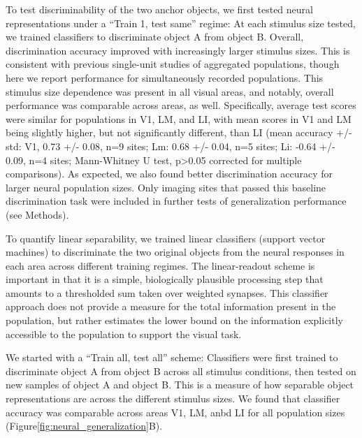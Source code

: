 To test discriminability of the two anchor objects, we first tested neural representations under a ``Train 1, test same'' regime: At each stimulus size tested, we trained classifiers to discriminate object A from object B. Overall, discrimination accuracy improved with increasingly larger stimulus sizes. This is consistent with previous single-unit studies of aggregated populations, though here we report performance for simultaneously recorded populations. This stimulus size dependence was present in all visual areas, and notably, overall performance was comparable across areas, as well. Specifically, average test scores were similar for populations in V1, LM, and LI, with mean scores in V1 and LM being slightly higher, but not significantly different, than LI (mean accuracy +/- std: V1, 0.73 +/- 0.08, n=9 sites; Lm: 0.68 +/- 0.04, n=5 sites; Li: -0.64 +/- 0.09, n=4 sites; Mann-Whitney U test, p>0.05 corrected for multiple comparisons). As expected, we also found better discrimination accuracy for larger neural population sizes. Only imaging sites that passed this baseline discrimination task were included in further tests of generalization performance (see Methods). 

To quantify linear separability, we trained linear classifiers (support vector machines) to discriminate the two original objects from the neural responses in each area across different training regimes. The linear-readout scheme is important in that it is a simple, biologically plausible processing step that amounts to a thresholded sum taken over weighted synapses. This classifier approach does not provide a measure for the total information present in the population, but rather estimates the lower bound on the information explicitly accessible to the population to support the visual task. 

We started with a ``Train all, test all'' scheme:  Classifiers were first trained to discriminate object A from object B across all stimulus conditions, then tested on new samples of object A and object B. This is a measure of how separable object representations are across the different stimulus sizes. We found that classifier accuracy was comparable across areas V1, LM, anbd LI for all population sizes (Figure\ref{fig:neural_generalization}B). %


